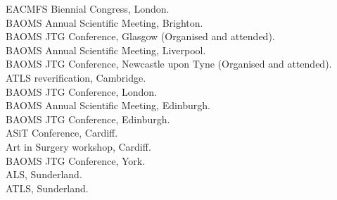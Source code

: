  EACMFS Biennial Congress, London. \\
 BAOMS Annual Scientific Meeting, Brighton. \\
 BAOMS JTG Conference, Glasgow (Organised and attended). \\
 BAOMS Annual Scientific Meeting, Liverpool. \\
 BAOMS JTG Conference, Newcastle upon Tyne (Organised and attended). \\
 ATLS reverification, Cambridge. \\
 BAOMS JTG Conference, London. \\
 BAOMS Annual Scientific Meeting, Edinburgh. \\
 BAOMS JTG Conference, Edinburgh. \\
 ASiT Conference, Cardiff. \\
 Art in Surgery workshop, Cardiff. \\
 BAOMS JTG Conference, York. \\
 ALS, Sunderland. \\
 ATLS, Sunderland. \\



